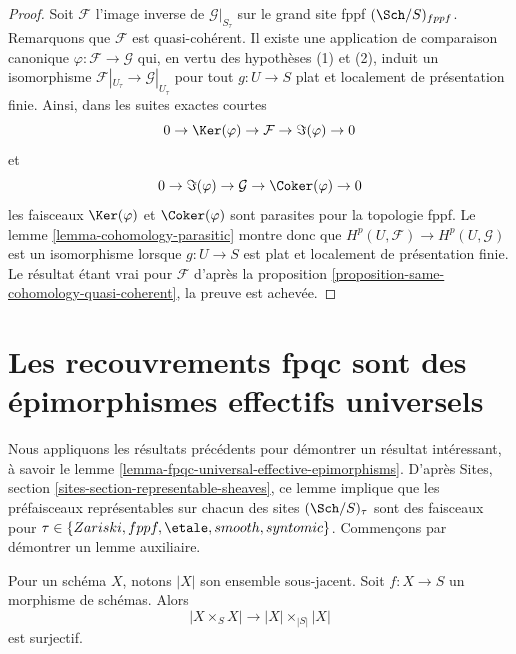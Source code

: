 \begin{proof}
Soit $\mathcal{F}$ l'image inverse de $\mathcal{G}|_{S_\tau}$ sur le grand
site fppf $(\Sch/S)_{fppf}$. Remarquons que $\mathcal{F}$ est quasi-cohérent.
Il existe une application de comparaison canonique
$\varphi : \mathcal{F} \to \mathcal{G}$ qui, en vertu des hypothèses (1) et
(2), induit un isomorphisme
$\mathcal{F}|_{U_\tau} \to \mathcal{G}|_{U_\tau}$ pour tout
$g : U \to S$ plat et localement de présentation finie.
Ainsi, dans les suites exactes courtes
$$
0 \to \Ker(\varphi) \to \mathcal{F} \to \Im(\varphi) \to 0
$$
et
$$
0 \to \Im(\varphi) \to \mathcal{G} \to \Coker(\varphi) \to 0
$$
les faisceaux $\Ker(\varphi)$ et $\Coker(\varphi)$ sont parasites pour la
topologie fppf. Le lemme \ref{lemma-cohomology-parasitic} montre donc que
$H^p(U, \mathcal{F}) \to H^p(U, \mathcal{G})$ est un isomorphisme lorsque
$g : U \to S$ est plat et localement de présentation finie.
Le résultat étant vrai pour $\mathcal{F}$ d'après la
proposition \ref{proposition-same-cohomology-quasi-coherent}, la preuve est
achevée.
\end{proof}













\section[Recouvrements fpqc et épimorphismes]{Les recouvrements fpqc sont des épimorphismes effectifs universels}
\label{section-fpqc-universal-effective-epimorphisms}

\noindent
Nous appliquons les résultats précédents pour démontrer un résultat
intéressant, à savoir le lemme
\ref{lemma-fpqc-universal-effective-epimorphisms}.
D'après Sites, section \ref{sites-section-representable-sheaves},
ce lemme implique que les préfaisceaux représentables sur chacun des sites
$(\Sch/S)_\tau$ sont des faisceaux pour
$\tau \in \{Zariski, fppf, \etale, smooth, syntomic\}$. Commençons
par démontrer un lemme auxiliaire.

\begin{lemma}
\label{lemma-equiv-fibre-product}
Pour un schéma $X$, notons $|X|$ son ensemble sous-jacent.
Soit $f : X \to S$ un morphisme de schémas.
Alors
$$
|X \times_S X| \to |X| \times_{|S|} |X|
$$
est surjectif.
\end{lemma}

